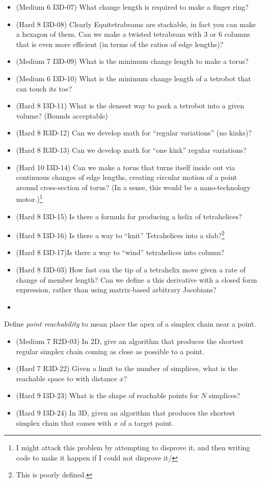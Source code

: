\documentclass[11pt]{article}
\begin{document}
\begin{itemize}
\item (Medium 6 I3D-07) What change length is required to make a finger ring?
\item (Hard 8 I3D-08) Clearly Equitetrabeams are stackable, in fact you can make a hexagon of them. Can we make a twisted tetrabeam with 3 or 6 columns that is even more efficient (in terms of the ratios of edge lengths)?
\item (Medium 7 I3D-09) What is the minimum change length to make a torus?
\item (Medium 6 I3D-10) What is the minimum change length of a tetrobot that can touch its toe?
\item (Hard 8 I3D-11) What is the densest way to pack a tetrobot into a given volume? (Bounds acceptable)
\item (Hard 8 R3D-12) Can we develop math for ``regular variations'' (no kinks)?
\item (Hard 8 R3D-13) Can we develop math for ``one kink'' regular variations?
\item (Hard 10 I3D-14) Can we make a torus that turns itself inside out via continuous changes of edge lengths,
  creating circular motion of a point around cross-section of torus? (In a sense, this would be a nano-technology motor.)\footnote{I might attack this problem by attempting to disprove it, and then writing code to make it happen if I could not disprove it/}
\item (Hard 8 I3D-15) Is there a formula for producing a helix of tetrahelices?
\item (Hard 8 I3D-16) Is there a way to ``knit'' Tetrahelices into  a slab?\footnote{This is poorly defined.}
\item (Hard 8 I3D-17)Is there a way to ``wind'' tetrahelices into column?
\item (Hard 8 I3D-03) How fast can the tip of a tetrahelix move given a rate of change of member length? Can we define a this derivative with a closed form expression, rather than using matrix-based arbitrary Jacobians?
\item 
\end{itemize}

Define {\em point reachability} to mean place the apex of a simplex chain near a point.
\begin{itemize}
\item  (Medium 7 R2D-03) In 2D, give an algorithm that produces the shortest regular simplex chain coming as close as possible to a point.
\item (Hard 7 R3D-22) Given a limit to the number of simplices, what is the reachable space to with distance $x$?
\item (Hard 9 I3D-23) What is the shape of reachable points for $N$ simplices?
  \item (Hard 9 I3D-24) In 3D, given an algorithm that produces the shortest simplex chain that comes with $x$ of a target point.
  \end{itemize}
\end{document}
